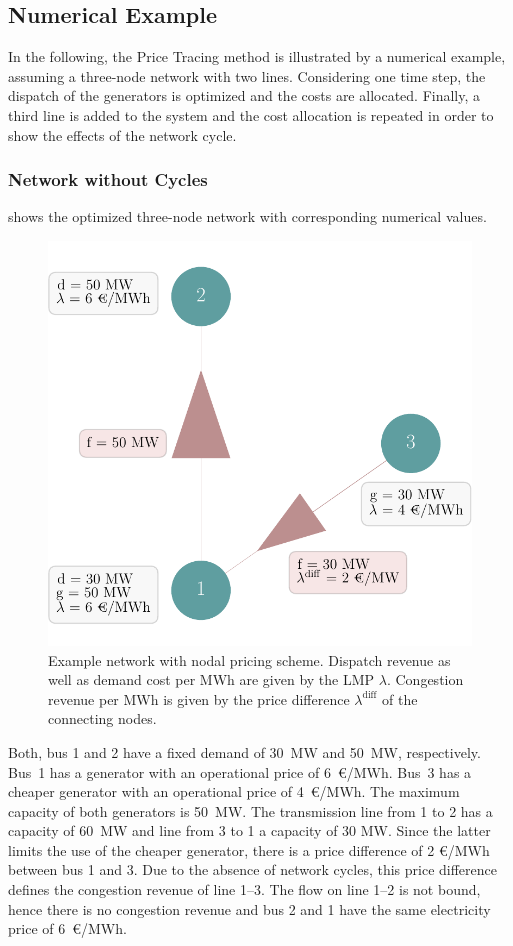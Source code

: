 \documentclass[11pt,twocolumn]{article}
\begin{document}
\subsection{Numerical Example}
\label{sec:numerical_example}

In the following, the Price Tracing method is illustrated by a numerical example, assuming a three-node network with two lines. Considering one time step, the dispatch of the generators is optimized and the costs are allocated. Finally, a third line is added to the system and the cost allocation is repeated in order to show the effects of the network cycle. 

\subsubsection*{Network without Cycles}
 shows the optimized three-node network with corresponding numerical values.
\begin{figure}[h!]
    \includegraphics[width=\linewidth]{example-without-cycles/network}
    \caption{Example network with nodal pricing scheme. Dispatch revenue as well as demand cost per MWh are given by the \ac{LMP} $\lambda$. Congestion revenue per MWh is given by the price difference $\lambda^\text{diff}$ of the connecting nodes.}
    \label{fig:example-network-wo}
\end{figure}
Both, bus 1 and 2 have a fixed demand of 30~MW and 50~MW, respectively. Bus~1 has a generator with an operational price of 6~\euro/MWh. Bus~3 has a cheaper generator with an operational price of 4~\euro/MWh. The maximum capacity of both generators is 50~MW. The transmission line from 1 to 2 has a capacity of 60~MW and line from 3 to 1 a capacity of 30 MW. Since the latter limits the use of the cheaper generator, there is a price difference of 2 \euro/MWh between bus 1 and 3. Due to the absence of network cycles, this price difference defines the congestion revenue of line 1--3. The flow on line 1--2 is not bound, hence there is no congestion revenue and bus 2 and 1 have the same electricity price of 6~\euro/MWh.  
\end{document}
